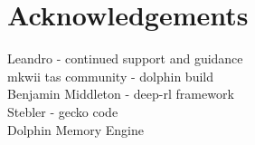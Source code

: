 
\chapter*{Acknowledgements}
Leandro - continued support and guidance
\\mkwii tas community - dolphin build
\\Benjamin Middleton - deep-rl framework
\\Stebler - gecko code
\\ Dolphin Memory Engine \cite{DolhpinMemoryEngine}